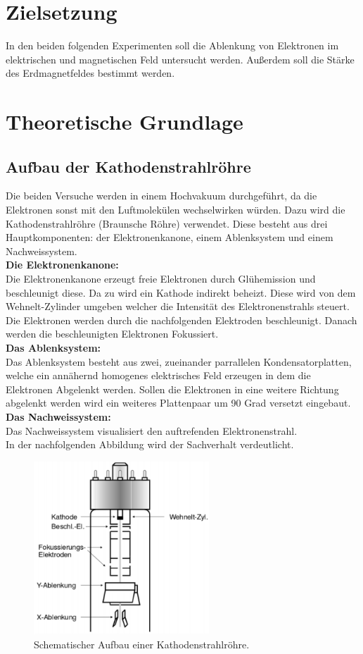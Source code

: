 \section{Zielsetzung}
In den beiden folgenden Experimenten soll die Ablenkung von Elektronen im elektrischen und magnetischen Feld untersucht werden. Außerdem soll die Stärke des Erdmagnetfeldes bestimmt werden.

\section{Theoretische Grundlage}
\label{sec:Theorie}
\subsection{Aufbau der Kathodenstrahlröhre}
Die beiden Versuche werden in einem Hochvakuum durchgeführt, da die Elektronen sonst mit den Luftmolekülen wechselwirken würden. Dazu wird die Kathodenstrahlröhre (Braunsche Röhre) verwendet. Diese besteht aus drei Hauptkomponenten: der Elektronenkanone, einem Ablenksystem und einem Nachweissystem.\\
\textbf{Die Elektronenkanone:} \\
Die Elektronenkanone erzeugt freie Elektronen durch Glühemission und beschleunigt diese. Da zu wird ein Kathode indirekt beheizt. Diese wird von dem Wehnelt-Zylinder umgeben welcher die Intensität des Elektronenstrahls steuert. Die Elektronen werden durch die nachfolgenden Elektroden beschleunigt. Danach werden die beschleunigten Elektronen Fokussiert. \\
\textbf{Das Ablenksystem:} \\
Das Ablenksystem besteht aus zwei, zueinander parrallelen Kondensatorplatten, welche ein annähernd homogenes elektrisches Feld erzeugen in dem die Elektronen Abgelenkt werden. Sollen die Elektronen in eine weitere Richtung abgelenkt werden wird ein weiteres Plattenpaar um 90 Grad versetzt eingebaut. \\
\textbf{Das Nachweissystem:} \\
Das Nachweissystem visualisiert den auftrefenden Elektronenstrahl.\\
In der nachfolgenden Abbildung wird der Sachverhalt verdeutlicht.

\begin{figure}[H]
	\centering
	\includegraphics[height=6.5cm]{picture/Kathodenstrahlroehre.PNG}
	\caption{Schematischer Aufbau einer Kathodenstrahlröhre. \cite[2]{V501}}
	\label{fig:Kathode}
\end{figure}

